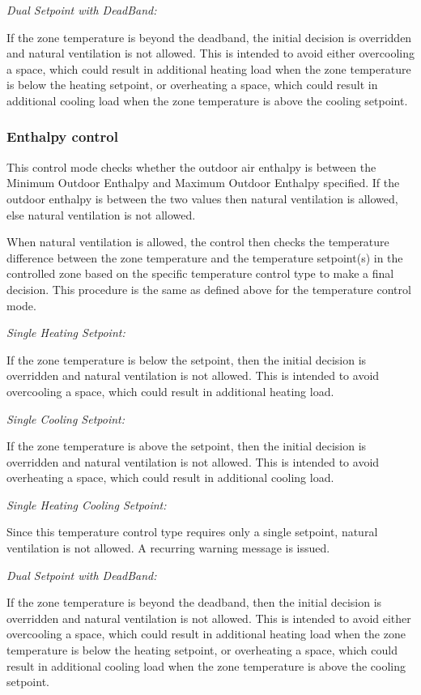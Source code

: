 \emph{Dual Setpoint with DeadBand:}

If the zone temperature is beyond the deadband, the initial decision is overridden and natural ventilation is not allowed. This is intended to avoid either overcooling a space, which could result in additional heating load when the zone temperature is below the heating setpoint, or overheating a space, which could result in additional cooling load when the zone temperature is above the cooling setpoint.

\subsubsection{Enthalpy control}\label{enthalpy-control}

This control mode checks whether the outdoor air enthalpy is between the Minimum Outdoor Enthalpy and Maximum Outdoor Enthalpy specified. If the outdoor enthalpy is between the two values then natural ventilation is allowed, else natural ventilation is not allowed.

When natural ventilation is allowed, the control then checks the temperature difference between the zone temperature and the temperature setpoint(s) in the controlled zone based on the specific temperature control type to make a final decision. This procedure is the same as defined above for the temperature control mode.

\emph{Single Heating Setpoint:}

If the zone temperature is below the setpoint, then the initial decision is overridden and natural ventilation is not allowed. This is intended to avoid overcooling a space, which could result in additional heating load.

\emph{Single Cooling Setpoint:}

If the zone temperature is above the setpoint, then the initial decision is overridden and natural ventilation is not allowed. This is intended to avoid overheating a space, which could result in additional cooling load.

\emph{Single Heating Cooling Setpoint:}

Since this temperature control type requires only a single setpoint, natural ventilation is not allowed. A recurring warning message is issued.

\emph{Dual Setpoint with DeadBand:}

If the zone temperature is beyond the deadband, then the initial decision is overridden and natural ventilation is not allowed. This is intended to avoid either overcooling a space, which could result in additional heating load when the zone temperature is below the heating setpoint, or overheating a space, which could result in additional cooling load when the zone temperature is above the cooling setpoint.

